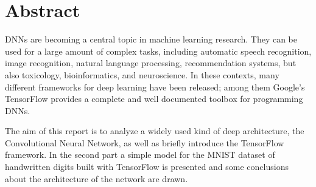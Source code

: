 \begingroup
\let\clearpage\relax
\let\cleardoublepage\relax
\let\cleardoublepage\relax

\chapter*{Abstract}
\acp{DNN} are becoming a central topic in machine learning research. They can be used for a large amount of complex tasks, including automatic speech recognition, image recognition, natural language processing, recommendation systems, but also toxicology, bioinformatics, and neuroscience. In these contexts, many different frameworks for deep learning have been released; among them Google's TensorFlow provides a complete and well documented toolbox for programming \acp{DNN}.

The aim of this report is to analyze a widely used kind of deep architecture, the Convolutional Neural Network, as well as briefly introduce the TensorFlow framework. In the second part a simple model for the MNIST dataset of handwritten digits built with TensorFlow is presented and some conclusions about the architecture of the network are drawn.

\endgroup			

\vfill